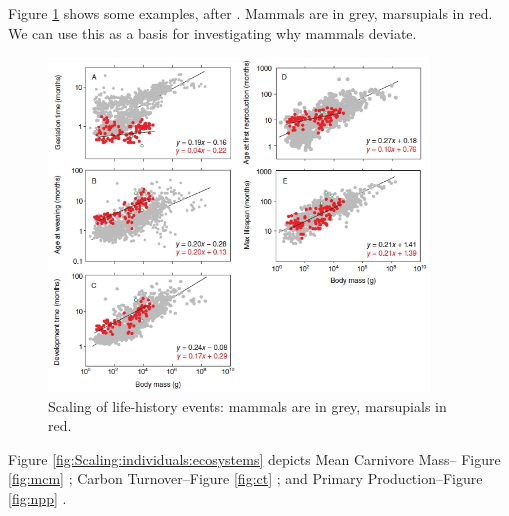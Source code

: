 \documentclass[]{article}
\begin{document}
Figure \ref{fig:ScalingExamples} shows some examples, after \cite{sibly2012metabolic}. Mammals are in grey, marsupials in red. We can use this as a basis for investigating why mammals deviate.
\begin{figure}[H]
	\caption[Scaling of life-history events]{Scaling of life-history events: mammals are in grey, marsupials in red.}\label{fig:ScalingExamples}
	\includegraphics[width=0.9\textwidth]{ScalingExamples}
\end{figure}


Figure \ref{fig:Scaling:individuals:ecosystems}	depicts Mean Carnivore Mass-- Figure \ref{fig:mcm} \cite{tucker2014evolutionary}; Carbon Turnover--Figure \ref {fig:ct} \cite{anderson2013altered}; and Primary Production--Figure \ref{fig:npp} \cite{enquist2012land}.
\end{document}
